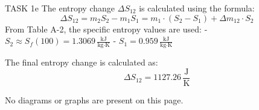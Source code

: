 TASK 1e  
The entropy change \( \Delta S_{12} \) is calculated using the formula:  
\[
\Delta S_{12} = m_2 S_2 - m_1 S_1 = m_1 \cdot (S_2 - S_1) + \Delta m_{12} \cdot S_2
\]  
From Table A-2, the specific entropy values are used:  
- \( S_2 \approx S_f(100) = 1.3069 \, \frac{\text{kJ}}{\text{kg·K}} \)  
- \( S_1 = 0.959 \, \frac{\text{kJ}}{\text{kg·K}} \)  

The final entropy change is calculated as:  
\[
\Delta S_{12} = 1127.26 \, \frac{\text{J}}{\text{K}}
\]  

No diagrams or graphs are present on this page.